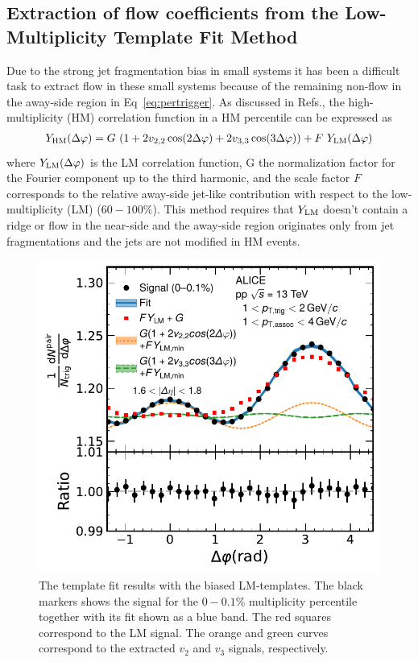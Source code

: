 \subsection{Extraction of flow coefficients from the Low-Multiplicity Template Fit Method}

Due to the strong jet fragmentation bias in small systems it has been a difficult task to extract flow in these small systems because of the remaining non-flow in the away-side region in Eq~\ref{eq:pertrigger}. As discussed in Refs.\cite{ATLAS:2015hzw,ATLAS:2016yzd}, the high-multiplicity (HM) correlation function in a HM percentile can be expressed as 
\begin{eqnarray}
Y_{\rm{HM}}(\Delta\varphi) = G~(1 + 2v_{2,2}\cos(2\Delta\varphi) + 2v_{3,3}\cos(3\Delta\varphi)) + F~Y_{\rm{LM}}(\Delta\varphi)
\end{eqnarray}
where $Y_{\rm{LM}}(\Delta\varphi)$ is the LM correlation function, G the normalization factor for the Fourier component up to the third harmonic, and the scale factor $F$ corresponds to the relative away-side jet-like contribution with respect to the low-multiplicity (LM) ($60-100\%$). This method requires that $Y_{\rm{LM}}$ doesn't contain a ridge or flow in the near-side and the away-side region originates only from jet fragmentations and the jets are not modified in HM events. 

\begin{figure}[h!]
	\centering
	\includegraphics[width=0.6 \textwidth]{figures/Fig1_FlowExt.pdf} 
	\caption{The template fit results with the biased LM-templates. The black markers shows the signal for the $0-0.1\%$ multiplicity percentile together with its fit shown as a blue band. The red squares correspond to the LM signal. The orange and green curves correspond to the extracted $v_2$ and $v_3$ signals, respectively.}
	\label{fig:flowext}
\end{figure}

